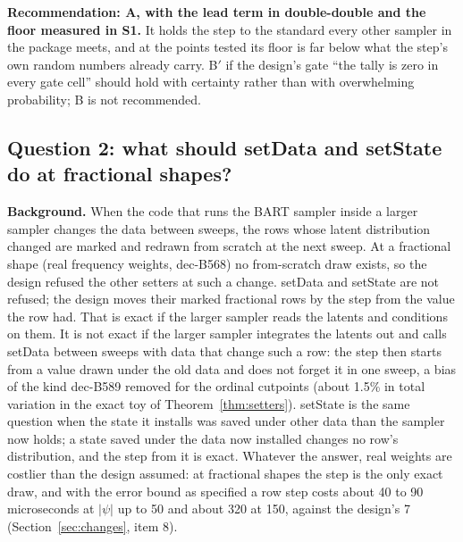 \textbf{Recommendation: A, with the lead term in double-double and the floor measured in S1.} It holds the step
to the standard every other sampler in the package meets, and at the points tested its floor is far below what
the step's own random numbers already carry. B$'$ if the design's gate ``the tally is
zero in every gate cell'' should hold with certainty rather than with overwhelming probability; B is not
recommended.

\subsection*{Question 2: what should setData and setState do at fractional shapes?}

\textbf{Background.} When the code that runs the BART sampler inside a larger sampler changes the data between
sweeps, the rows whose latent distribution changed are marked and redrawn from scratch at the next sweep. At a
fractional shape (real frequency weights, dec-B568) no from-scratch draw exists, so the design refused the other
setters at such a change. setData and setState are not refused; the design moves their marked fractional rows by the step from
the value the row had. That is exact if the larger sampler reads the latents and conditions on them. It is not
exact if the larger sampler integrates the latents out and calls setData between sweeps with data that change
such a row: the step then starts from
a value drawn under the old data and does not forget it in one sweep, a bias of the kind dec-B589 removed for the
ordinal cutpoints (about 1.5\% in total variation in the exact toy of Theorem~\ref{thm:setters}). setState is
the same question when the state it installs was saved under other data than the sampler now holds; a state saved
under the data now installed changes no row's distribution, and the step from it is exact. Whatever the answer,
real weights are costlier than the design assumed: at fractional shapes the step is the only exact draw, and with
the error bound as specified a row step costs about 40 to 90 microseconds at $|\psi|$ up to 50 and about 320 at
150, against the design's 7 (Section~\ref{sec:changes}, item 8).

